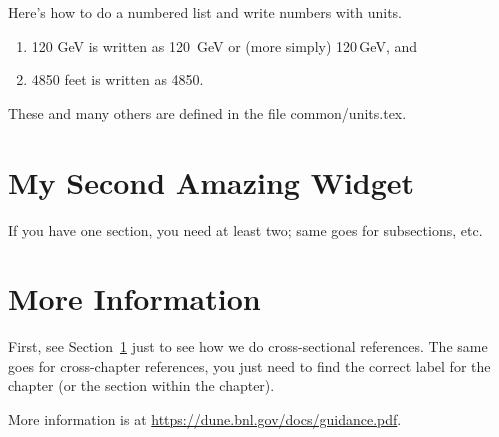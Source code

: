 Here's how to do a numbered list and write numbers with units. 
\begin{enumerate}
    \item 120 GeV is written as \SI{120}{\GeV} or (more simply)  120\,GeV, and
    \item 4850 feet is written as \SI{4850}{\ft}.
\end{enumerate}

These and many others are defined in the file common/units.tex.

\section{My Second Amazing Widget}
\label{sec:chap-id:my2ndwidget}

If you have one section, you need at least two; same goes for subsections, etc. 

\section{More Information}
\label{sec:chap-id:moreinfo}

First, see Section~\ref{sec:chap-id:my2ndwidget} just to see how we do cross-sectional references.  The same goes for cross-chapter references, you just need to find the correct label for the chapter (or the section within the chapter).

More information is at \url{https://dune.bnl.gov/docs/guidance.pdf}.
